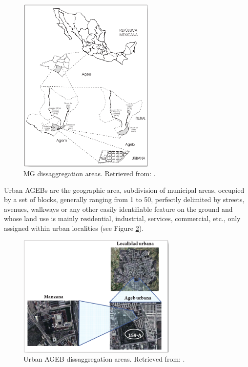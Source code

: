 \begin{figure}[h!]
	\centering
	\includegraphics[width=0.6\textwidth]{Figures/MGN_divisions.png}
	\caption{MG dissaggregation areas. Retrieved from: \cite{manualMGN}.
		\label{fig:MGN_divisions}}
\end{figure}

Urban AGEBs are the geographic area, subdivision of municipal areas, occupied by a set of blocks, generally ranging from 1 to 50, perfectly delimited by streets, avenues, walkways or any other easily identifiable feature on the ground and whose land use is mainly residential, industrial, services, commercial, etc., only assigned within urban localities (see Figure \ref{fig:ageb_division}).

\begin{figure}[h!]
	\centering
	\includegraphics[width=0.7\textwidth]{Figures/ageb_division.png}
	\caption{Urban AGEB dissaggregation areas. Retrieved from: \cite{manualMGN}.
		\label{fig:ageb_division}}
\end{figure}


